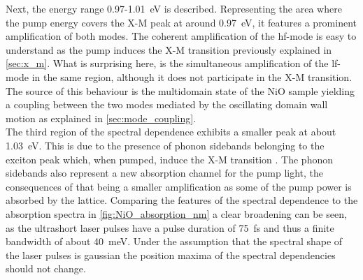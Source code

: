 Next, the energy range 0.97-\qty{1.01}{eV} is described.
Representing the area where the pump energy covers the X-M peak at around \qty{0.97}{eV},
it features a prominent amplification of both modes.
The coherent amplification of the hf-mode is easy to understand as the pump induces the X-M transition previously explained in \autoref{sec:x_m}.
What is surprising here, is the simultaneous amplification of the lf-mode in the same region, although it does not participate in the X-M transition.
The source of this behaviour is the multidomain state of the NiO sample yielding a coupling between the two modes mediated by the oscillating domain wall motion as explained in \autoref{sec:mode_coupling}. \\
The third region of the spectral dependence exhibits a smaller peak at about \qty{1.03}{eV}.
This is due to the presence of phonon sidebands belonging to the exciton peak which, when pumped, induce the X-M transition \cite{bossini_ultrafast_2021}.
The phonon sidebands also represent a new absorption channel for the pump light, the consequences of that being a smaller amplification as some of the pump power is absorbed by the lattice.
Comparing the features of the spectral dependence to the absorption spectra in \autoref{fig:NiO_absorption_nm} a clear broadening can be seen, as the ultrashort laser pulses have a pulse duration of \qty{75}{fs} and thus a finite bandwidth of about \qty{40}{meV}.
Under the assumption that the spectral shape of the laser pulses is gaussian the position maxima of the spectral dependencies should not change.

